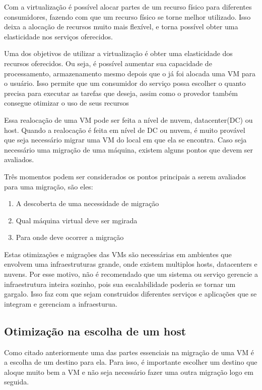 Com a virtualização é possível alocar partes de um recurso físico para diferentes consumidores, 
fazendo com que um recurso físico se torne melhor utilizado. Isso deixa a alocação de recursos
muito mais flexível, e torna possível obter uma elasticidade nos serviços oferecidos. 

Uma dos objetivos de utilizar a virtualização é obter uma elasticidade dos recursos oferecidos.
Ou seja, é possível aumentar sua capacidade de processamento, armazenamento mesmo depois que o
já foi alocada uma VM para o usuário. 
Isso permite que um consumidor do  serviço possa escolher o quanto precisa para executar as tarefas que deseja, 
assim como o provedor também consegue otimizar o uso de seus recursos

Essa realocação de uma VM pode ser feita a nível de nuvem, datacenter(DC) ou host. 
Quando a realocação é feita em nível de DC ou nuvem, é muito provável que seja 
necessário migrar uma VM do local em que ela se encontra. 
Caso seja necessário uma migração de uma máquina, existem alguns pontos que devem ser avaliados.

Três momentos podem ser considerados os pontos principais a serem avaliados para uma migração, 
são eles:

\begin{enumerate}
\item A descoberta de uma necessidade de migração
\item Qual máquina virtual deve ser mgirada
\item Para onde deve ocorrer a migração
\end{enumerate}

Estas otimizações e migrações das VMs são necessárias em ambientes que envolvem uma infraestruturas
grande, onde existem multiplos hosts, datacenters e nuvens. Por esse motivo, não é recomendado que 
um sistema ou serviço gerencie a infraestrutura inteira sozinho, pois sua escalabilidade 
poderia se tornar um gargalo. Isso faz com que sejam construidos diferentes serviços e aplicações 
que se integram e gerenciam a infraesturua.

\subsection{Otimização na escolha de um host}
Como citado anteriormente uma das partes essenciais na migração de uma VM é a escolha de um destino para ela.
Para isso, é importante escolher um destino que aloque muito bem a VM e não seja necessário fazer uma outra
migração logo em seguida. 
